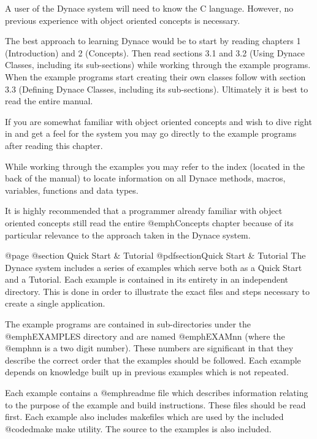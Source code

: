 A user of the Dynace system will need to know the C language.  However,
no previous experience with object oriented concepts is necessary.

The best approach to learning Dynace would be to start by reading
chapters 1 (Introduction) and 2 (Concepts).  Then read sections 3.1 and
3.2 (Using Dynace Classes, including its sub-sections) while working
through the example programs.  When the example programs start creating
their own classes follow with section 3.3 (Defining Dynace Classes,
including its sub-sections).  Ultimately it is best to read the entire
manual.

If you are somewhat familiar with object oriented concepts and wish
to dive right in and get a feel for the system you may go directly
to the example programs after reading this chapter.

While working through the examples you may refer to the index (located
in the back of the manual) to locate information on all Dynace methods,
macros, variables, functions and data types.


It is highly recommended that a programmer already familiar with object
oriented concepts still read the entire @emph{Concepts} chapter because
of its particular relevance to the approach taken in the Dynace system.







@page
@section Quick Start & Tutorial
@pdfsection{Quick Start & Tutorial}
The Dynace system includes a series of examples which serve both as a
Quick Start and a Tutorial.  Each example is contained in its entirety
in an independent directory.  This is done in order to illustrate the
exact files and steps necessary to create a single application.

The example programs are contained in sub-directories under the
@emph{EXAMPLES} directory and are named @emph{EXAMnn} (where the
@emph{nn} is a two digit number).  These numbers are significant in that
they describe the correct order that the examples should be followed.
Each example depends on knowledge built up in previous examples which is
not repeated.

Each example contains a @emph{readme} file which describes information
relating to the purpose of the example and build instructions.  These
files should be read first.  Each example also includes makefiles
which are used by the included @code{dmake} make utility.
The source to the examples is also included.

